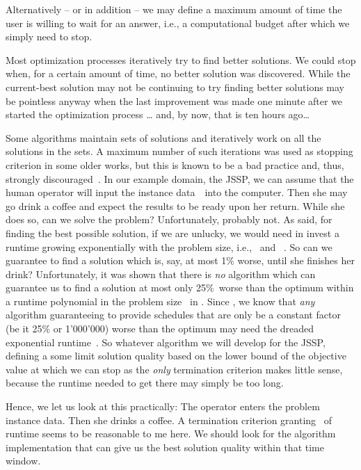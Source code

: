 Alternatively -- or in addition -- we may define a maximum amount of time the user is willing to wait for an answer, i.e., a computational budget after which we simply need to stop.

Most optimization processes iteratively try to find better solutions.
We could stop when, for a certain amount of time, no better solution was discovered.
While the current-best solution may not be  continuing to try finding better solutions may be pointless anyway when the last improvement was made one minute after we started the optimization process {\dots} and, by now, that is ten hours ago{\dots}

Some algorithms maintain sets of solutions and iteratively work on all the solutions in the sets.
A maximum number of such iterations was used as stopping criterion in some older works, but this is known to be a bad practice and, thus, strongly discouraged~\cite{RLMC2022MNOGAASCCH}.%
%
\endhsection%
%
%
\label{sec:jssp:termination}%
%
In our example domain, the \gls{JSSP}, we can assume that the human operator will input the instance data~\instance\ into the computer.
Then she may go drink a coffee and expect the results to be ready upon her return.
While she does so, can we solve the problem?
Unfortunately, probably not.
As said, for finding the best possible solution, if we are unlucky, we would need in invest a runtime growing exponentially with the problem size, i.e., \jsspMachines\ and \jsspJobs~\cite{LLRKS1993SASAAC,CPW1998AROMSCAAA}.
So can we guarantee to find a solution which is, say, at most 1\% worse, until she finishes her drink?
Unfortunately, it was shown that there is \emph{no} algorithm which can guarantee us to find a solution at most only 25\%~worse than the optimum within a runtime polynomial in the problem size~\cite{WHHHLSS1997SSS,JMSO2005ASFJSSPWCPT} in \citeyear{WHHHLSS1997SSS}.
Since \citeyear{MS2011HOAFAJSSP}, we know that \emph{any} algorithm guaranteeing to provide schedules that are only be a constant factor (be it 25\% or 1'000'000) worse than the optimum may need the dreaded exponential runtime~\cite{MS2011HOAFAJSSP}.
So whatever algorithm we will develop for the \gls{JSSP}, defining a some limit solution quality based on the lower bound of the objective value at which we can stop as the \emph{only} termination criterion makes little sense, because the runtime needed to get there may simply be too long.

Hence, we let us look at this practically:
The operator enters the problem instance data.
Then she drinks a coffee.
A termination criterion granting \jsspRuntime\ of runtime seems to be reasonable to me here.
We should look for the algorithm implementation that can give us the best solution quality within that time window.

